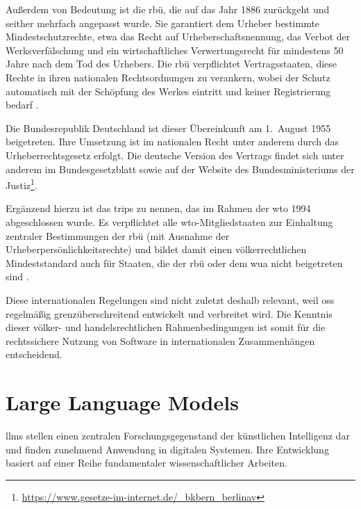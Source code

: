 Außerdem von Bedeutung ist die \gls{rbü}, die auf das Jahr 1886 zurückgeht und seither mehrfach angepasst wurde.
Sie garantiert dem Urheber bestimmte Mindestschutzrechte, etwa das Recht auf Urheberschaftsnennung, das Verbot der Werksverfälschung und ein wirtschaftliches Verwertungsrecht für mindestens 50 Jahre nach dem Tod des Urhebers.
Die \gls{rbü} verpflichtet Vertragsstaaten, diese Rechte in ihren nationalen Rechtsordnungen zu verankern, wobei der Schutz automatisch mit der Schöpfung des Werkes eintritt und keiner Registrierung bedarf \autocite{meckel_definition_nodate-1}.

Die Bundesrepublik Deutschland ist dieser Übereinkunft am 1.\ August 1955 beigetreten.
Ihre Umsetzung ist im nationalen Recht unter anderem durch das Urheberrechtsgesetz erfolgt.
Die deutsche Version des Vertrags findet sich unter anderem im Bundesgesetzblatt sowie auf der Website des Bundesministeriums der Justiz\footnote{\url{https://www.gesetze-im-internet.de/\_bkbern\_berlinav}}.

Ergänzend hierzu ist das \gls{trips} zu nennen, das im Rahmen der \gls{wto} 1994 abgeschlossen wurde.
Es verpflichtet alle \gls{wto}-Mitgliedstaaten zur Einhaltung zentraler Bestimmungen der \gls{rbü} (mit Ausnahme der Urheberpersönlichkeitsrechte) und bildet damit einen völkerrechtlichen Mindeststandard auch für Staaten, die der \gls{rbü} oder dem \gls{wua} nicht beigetreten sind \autocite{malbon_standards_2014}.

Diese internationalen Regelungen sind nicht zuletzt deshalb relevant, weil \gls{oss} regelmäßig grenzüberschreitend entwickelt und verbreitet wird.
Die Kenntnis dieser völker- und handelsrechtlichen Rahmenbedingungen ist somit für die rechtssichere Nutzung von Software in internationalen Zusammenhängen entscheidend.


\section{Large Language Models}

\glspl{llm} stellen einen zentralen Forschungsgegenstand der künstlichen Intelligenz dar und finden zunehmend Anwendung in digitalen Systemen.
Ihre Entwicklung basiert auf einer Reihe fundamentaler wissenschaftlicher Arbeiten.

